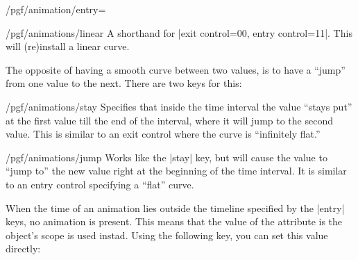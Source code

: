 \begin{key}{/pgf/animation/entry=}
  \begin{key}{/pgf/animations/linear}
    A shorthand for |exit control={0}{0}, entry control={1}{1}|. This
    will (re)install a linear curve.
  \end{key}

  The opposite of having a smooth curve between two values, is to have
  a ``jump'' from one value to the next. There are two keys for this:


  \begin{key}{/pgf/animations/stay}
    Specifies that inside the time interval the value ``stays put'' at
    the first value till the end of the interval, where it will jump
    to the second value. This is similar to an exit control where the
    curve is ``infinitely flat.''
    
\begin{codeexample}[animation list={0.5,1,1.5,2,2.5}]
\end{codeexample}
  \end{key}
  
  \begin{key}{/pgf/animations/jump}
    Works like the |stay| key, but will cause the value to ``jump to''
    the new value right at the beginning of the time interval. It is
    similar to an entry control specifying a ``flat'' curve.

\begin{codeexample}[animation list={0.5,1,1.5,2}]
\end{codeexample}
  \end{key}

\end{key}


When the time of an animation lies outside the timeline specified by
the |entry| keys, no animation is present. This means that the
value of the attribute is the object's scope is used instad. Using the
following key, you can set this value directly:

